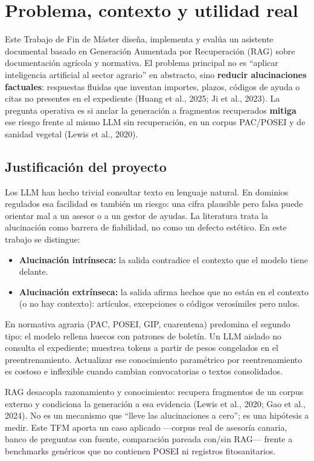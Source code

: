 \chapter{Problema, contexto y utilidad real}

Este Trabajo de Fin de Máster diseña, implementa y evalúa un asistente documental basado en Generación Aumentada por Recuperación (RAG) sobre documentación agrícola y normativa. El problema principal no es ``aplicar inteligencia artificial al sector agrario'' en abstracto, sino \textbf{reducir alucinaciones factuales}: respuestas fluidas que inventan importes, plazos, códigos de ayuda o citas no presentes en el expediente (Huang et al., 2025; Ji et al., 2023). La pregunta operativa es si anclar la generación a fragmentos recuperados \textbf{mitiga} ese riesgo frente al mismo LLM sin recuperación, en un corpus PAC/POSEI y de sanidad vegetal (Lewis et al., 2020).

\section{Justificación del proyecto}

Los LLM han hecho trivial consultar texto en lenguaje natural. En dominios regulados esa facilidad es también un riesgo: una cifra plausible pero falsa puede orientar mal a un asesor o a un gestor de ayudas. La literatura trata la alucinación como barrera de fiabilidad, no como un defecto estético. En este trabajo se distingue:

\begin{itemize}
  \item \textbf{Alucinación intrínseca:} la salida contradice el contexto que el modelo tiene delante.
  \item \textbf{Alucinación extrínseca:} la salida afirma hechos que no están en el contexto (o no hay contexto): artículos, excepciones o códigos verosímiles pero nulos.
\end{itemize}

En normativa agraria (PAC, POSEI, GIP, cuarentena) predomina el segundo tipo: el modelo rellena huecos con patrones de boletín. Un LLM aislado no consulta el expediente; muestrea tokens a partir de pesos congelados en el preentrenamiento. Actualizar ese conocimiento paramétrico por reentrenamiento es costoso e inflexible cuando cambian convocatorias o textos consolidados.

RAG desacopla razonamiento y conocimiento: recupera fragmentos de un corpus externo y condiciona la generación a esa evidencia (Lewis et al., 2020; Gao et al., 2024). No es un mecanismo que ``lleve las alucinaciones a cero''; es una hipótesis a medir. Este TFM aporta un caso aplicado ---corpus real de asesoría canaria, banco de preguntas con fuente, comparación pareada con/sin RAG--- frente a benchmarks genéricos que no contienen POSEI ni registros fitosanitarios.

